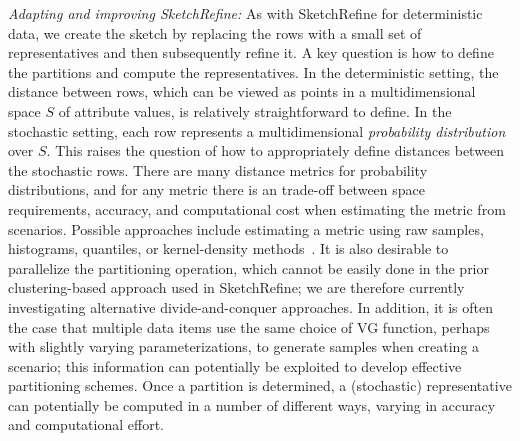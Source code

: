 \documentclass[11pt]{article}
\newcommand{\skref}{{\sc SketchRefine}\xspace}
\begin{document}
\smallskip
\emph{Adapting and improving SketchRefine:} As with \skref for deterministic data, we create the sketch by replacing the rows with a small set of representatives and then subsequently refine it. A key question is how to define the partitions and compute the representatives. In the deterministic setting, the distance between rows, which can be viewed as points in a multidimensional space $S$ of attribute values, is relatively straightforward to define. In the stochastic setting, each row represents a multidimensional \emph{probability distribution} over $S$. This raises the question of how to appropriately define distances between the stochastic rows. There are many distance metrics for probability distributions, and for any metric there is an trade-off between space requirements, accuracy, and computational cost when estimating the metric from scenarios. Possible approaches include estimating a metric using raw samples, histograms, quantiles, or kernel-density methods~\cite{silverman2018density}. It is also desirable to parallelize the partitioning operation, which cannot be easily done in the prior clustering-based approach used in \skref; we are therefore currently investigating alternative divide-and-conquer approaches. In addition, it is often the case that multiple data items use the same choice of VG function, perhaps with slightly varying parameterizations, to generate samples when creating a scenario; this information can potentially be exploited to develop effective partitioning schemes. Once a partition is determined, a (stochastic) representative can potentially be computed in a number of different ways, varying in accuracy and computational effort.
\end{document}
